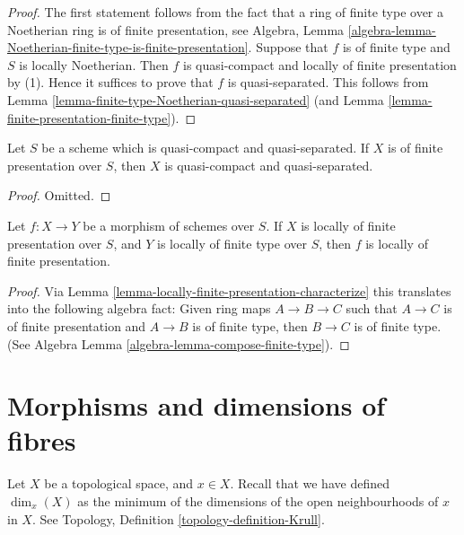 \begin{proof}
The first statement follows from the fact that a ring
of finite type over a Noetherian ring is of finite presentation, see Algebra,
Lemma \ref{algebra-lemma-Noetherian-finite-type-is-finite-presentation}.
Suppose that $f$ is of finite type and $S$ is locally Noetherian.
Then $f$ is quasi-compact and locally of finite presentation by (1).
Hence it suffices to prove that $f$ is quasi-separated.
This follows from Lemma \ref{lemma-finite-type-Noetherian-quasi-separated}
(and Lemma \ref{lemma-finite-presentation-finite-type}).
\end{proof}

\begin{lemma}
\label{lemma-finite-presentation-quasi-compact-quasi-separated}
Let $S$ be a scheme which is quasi-compact and quasi-separated.
If $X$ is of finite presentation over $S$, then $X$ is quasi-compact
and quasi-separated.
\end{lemma}

\begin{proof}
Omitted.
\end{proof}

\begin{lemma}
\label{lemma-finite-presentation-permanence}
Let $f : X \to Y$ be a morphism of schemes over $S$.
If $X$ is locally of finite presentation over $S$, and
$Y$ is locally of finite type over $S$, then $f$ is locally
of finite presentation.
\end{lemma}

\begin{proof}
Via Lemma \ref{lemma-locally-finite-presentation-characterize} this translates
into the following algebra
fact: Given ring maps $A \to B \to C$ such that $A \to C$ is
of finite presentation and $A \to B$ is of finite type,
then $B \to C$ is of finite type.
(See Algebra Lemma \ref{algebra-lemma-compose-finite-type}).
\end{proof}








\section{Morphisms and dimensions of fibres}
\label{section-dimension-fibres}

\noindent
Let $X$ be a topological space, and $x \in X$.
Recall that we have defined $\dim_x(X)$ as the minimum of the
dimensions of the open neighbourhoods of $x$ in $X$.
See Topology, Definition \ref{topology-definition-Krull}.


